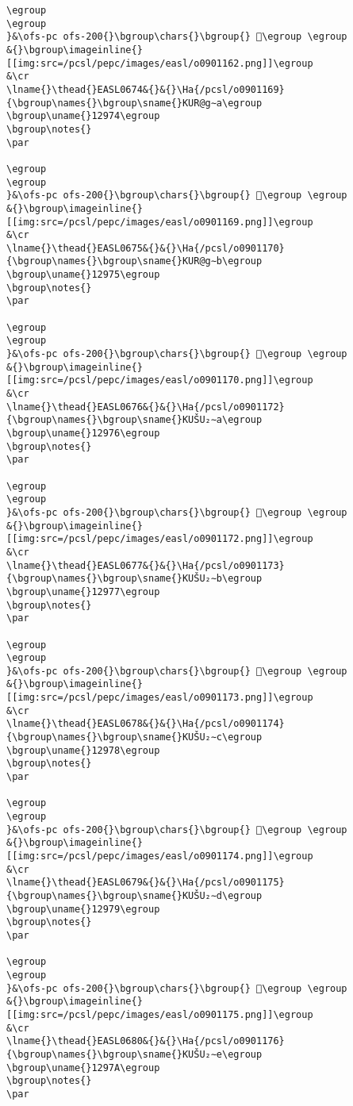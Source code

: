 \begin{verbatim}
\egroup
\egroup
}&\ofs-pc ofs-200{}\bgroup\chars{}\bgroup{} 𒥳\egroup \egroup
&{}\bgroup\imageinline{}[[img:src=/pcsl/pepc/images/easl/o0901162.png]]\egroup
&\cr
\lname{}\thead{}EASL0674&{}&{}\Ha{/pcsl/o0901169}{\bgroup\names{}\bgroup\sname{}KUR@g∼a\egroup
\bgroup\uname{}12974\egroup
\bgroup\notes{}
\par 

\egroup
\egroup
}&\ofs-pc ofs-200{}\bgroup\chars{}\bgroup{} 𒥴\egroup \egroup
&{}\bgroup\imageinline{}[[img:src=/pcsl/pepc/images/easl/o0901169.png]]\egroup
&\cr
\lname{}\thead{}EASL0675&{}&{}\Ha{/pcsl/o0901170}{\bgroup\names{}\bgroup\sname{}KUR@g∼b\egroup
\bgroup\uname{}12975\egroup
\bgroup\notes{}
\par 

\egroup
\egroup
}&\ofs-pc ofs-200{}\bgroup\chars{}\bgroup{} 𒥵\egroup \egroup
&{}\bgroup\imageinline{}[[img:src=/pcsl/pepc/images/easl/o0901170.png]]\egroup
&\cr
\lname{}\thead{}EASL0676&{}&{}\Ha{/pcsl/o0901172}{\bgroup\names{}\bgroup\sname{}KUŠU₂∼a\egroup
\bgroup\uname{}12976\egroup
\bgroup\notes{}
\par 

\egroup
\egroup
}&\ofs-pc ofs-200{}\bgroup\chars{}\bgroup{} 𒥶\egroup \egroup
&{}\bgroup\imageinline{}[[img:src=/pcsl/pepc/images/easl/o0901172.png]]\egroup
&\cr
\lname{}\thead{}EASL0677&{}&{}\Ha{/pcsl/o0901173}{\bgroup\names{}\bgroup\sname{}KUŠU₂∼b\egroup
\bgroup\uname{}12977\egroup
\bgroup\notes{}
\par 

\egroup
\egroup
}&\ofs-pc ofs-200{}\bgroup\chars{}\bgroup{} 𒥷\egroup \egroup
&{}\bgroup\imageinline{}[[img:src=/pcsl/pepc/images/easl/o0901173.png]]\egroup
&\cr
\lname{}\thead{}EASL0678&{}&{}\Ha{/pcsl/o0901174}{\bgroup\names{}\bgroup\sname{}KUŠU₂∼c\egroup
\bgroup\uname{}12978\egroup
\bgroup\notes{}
\par 

\egroup
\egroup
}&\ofs-pc ofs-200{}\bgroup\chars{}\bgroup{} 𒥸\egroup \egroup
&{}\bgroup\imageinline{}[[img:src=/pcsl/pepc/images/easl/o0901174.png]]\egroup
&\cr
\lname{}\thead{}EASL0679&{}&{}\Ha{/pcsl/o0901175}{\bgroup\names{}\bgroup\sname{}KUŠU₂∼d\egroup
\bgroup\uname{}12979\egroup
\bgroup\notes{}
\par 

\egroup
\egroup
}&\ofs-pc ofs-200{}\bgroup\chars{}\bgroup{} 𒥹\egroup \egroup
&{}\bgroup\imageinline{}[[img:src=/pcsl/pepc/images/easl/o0901175.png]]\egroup
&\cr
\lname{}\thead{}EASL0680&{}&{}\Ha{/pcsl/o0901176}{\bgroup\names{}\bgroup\sname{}KUŠU₂∼e\egroup
\bgroup\uname{}1297A\egroup
\bgroup\notes{}
\par 


\end{verbatim}
